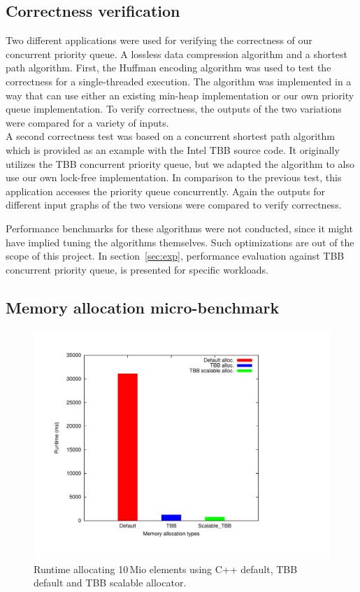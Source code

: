 \subsection{Correctness verification}
\label{subsec:corr_ver}
Two different applications were used for verifying the correctness of our concurrent priority queue.
A lossless data compression algorithm and a shortest path algorithm. 
First, the Huffman encoding algorithm was used to test the correctness for a single-threaded execution. The algorithm was implemented in a way that can use either an existing min-heap implementation or our own priority queue implementation.
To verify correctness, the outputs of the two variations were compared for a variety of inputs.\\
A second correctness test was based on a concurrent shortest path algorithm which is provided as an example with the Intel TBB source code.
It originally utilizes the TBB concurrent priority queue, but we adapted the algorithm to also use our own lock-free implementation.
In comparison to the previous test, this application accesses the priority queue concurrently.
Again the outputs for different input graphs of the two versions were compared to verify correctness.

Performance benchmarks for these algorithms were not conducted, since it might have implied tuning the algorithms themselves.
Such optimizations are out of the scope of this project.
In section~\ref{sec:exp}, performance evaluation against TBB concurrent priority queue, is presented for specific workloads.

\subsection{Memory allocation micro-benchmark}
\begin{figure}[t]
	\centering
	\includegraphics[scale=0.3]{../plots/mem_alloc/mem_alloc.pdf}
	\caption{Runtime allocating 10\,Mio elements using C++ default, TBB default and TBB scalable allocator.}
	\label{fig:mem_alloc}
\end{figure}

